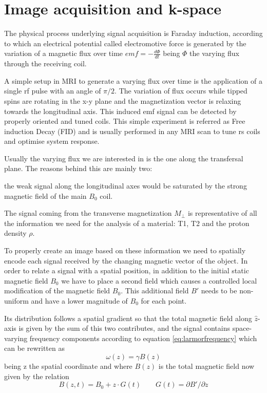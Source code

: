 \documentclass[10pt]{report}
\begin{document}
\section{Image acquisition and k-space}

The physical process underlying signal acquisition is Faraday induction, according to which an electrical potential called electromotive force is generated by the variation of a magnetic flux over time $emf = -\frac{d\Phi}{dt}$ being $\Phi$ the varying flux through the receiving coil.

A simple setup in MRI to generate a varying flux over time is the application of a single rf pulse with an angle of $\pi/2$. The variation of flux occurs while tipped spins are rotating in the x-y plane and the magnetization vector is relaxing towards the longitudinal axis.
This induced emf signal can be detected by properly oriented and tuned coils. This simple experiment is referred as Free induction Decay (FID) and is usually performed in any MRI scan to tune rs coils and optimise system response.

Usually the varying flux we are interested in is the one along the transfersal plane. The reasons behind this are mainly two:
\begin{enumerate*}
\item the weak signal along the longitudinal axes would be saturated by the strong magnetic field of the main $B_0$ coil.
\item The signal coming from the transverse magnetization $M_\perp$ is representative of all the information we need for the analysis of a material: T1, T2 and the proton density $\rho$.
\end{enumerate*}

\hfill

To properly create an image based on these information we need to spatially encode each signal received by the changing magnetic vector of the object.
In order to relate a signal with a spatial position, in addition to the initial static magnetic field $B_0$ we have to place a second field which causes a controlled local modification of the magnetic field $B_0$. This additional field $B'$ needs to be non-uniform and have a lower magnitude of $B_0$ for each point.

Its distribution follows a spatial gradient so that the total magnetic field along $\hat z$-axis is given by the sum of this two contributes, and the signal contains space-varying frequency components according to equation \ref{eq:larmorfrequency} which can be rewritten as
\[
\omega(z) = \gamma B(z)
\]
being z the spatial coordinate and where $B(z)$ is the total magnetic field now given by the relation
\begin{equation}
B(z, t) = B_0 + z\cdot G(t) \qquad G(t) =\partial B'/\partial z
\end{equation}
\end{document}
